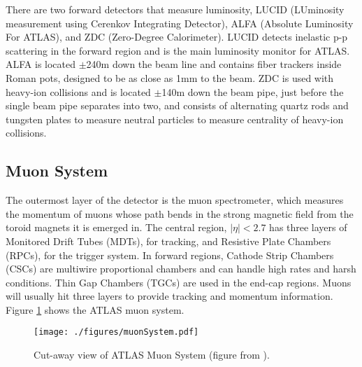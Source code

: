 There are two forward detectors that measure luminosity, LUCID (LUminosity measurement using Cerenkov Integrating Detector), ALFA (Absolute Luminosity For ATLAS), and ZDC (Zero-Degree Calorimeter).  LUCID detects inelastic p-p scattering in the forward region and is the main luminosity monitor for ATLAS.  ALFA is located $\pm$240m down the beam line and contains fiber trackers inside Roman pots, designed to be as close as 1mm to the beam.  ZDC is used with heavy-ion collisions and is located $\pm$140m down the beam pipe, just before the single beam pipe separates into two, and consists of alternating quartz rods and tungsten plates to measure neutral particles to measure centrality of heavy-ion collisions.\\







\subsection{Muon System}

The outermost layer of the detector is the muon spectrometer, which measures the momentum of muons whose path bends in the strong magnetic field from the toroid magnets it is emerged in.  The central region, $|\eta|<2.7$ has three layers of Monitored Drift Tubes (MDTs), for tracking, and Resistive Plate Chambers (RPCs), for the trigger system.  In forward regions, Cathode Strip Chambers (CSCs) are multiwire proportional chambers and can handle high rates and harsh conditions.  Thin Gap Chambers (TGCs) are used in the end-cap regions.  Muons will usually hit three layers to provide tracking and momentum information.  Figure \ref{fig:muonCutAway} shows the ATLAS muon system.  \\

\begin{figure}[h!]
  \centering
	\texttt{[image: ./figures/muonSystem.pdf]}
\caption[Cut-away view of ATLAS Muon System]{\label{fig:muonCutAway}{ Cut-away view of ATLAS Muon System (figure from \cite{DetectorPaper:2008}). }} %
\end{figure}

